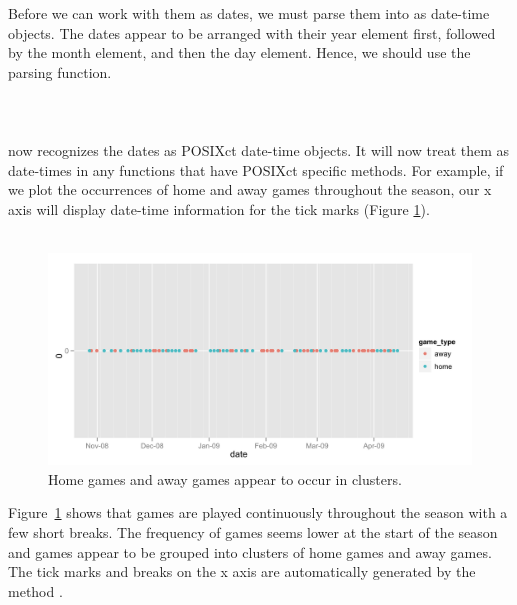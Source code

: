 \documentclass[article]{jss}
\begin{document}
Before we can work with them as dates, we must parse them into  as date-time objects. The dates appear to be arranged with their year element first, followed by the month element, and then the day element. Hence, we should use the  parsing function.\\

\\
\\
\\

 now recognizes the dates as POSIXct date-time objects. It will now treat them as date-times in any functions that have POSIXct specific methods. For example, if we plot the occurrences of home and away games throughout the season, our x axis will display date-time information for the tick marks (Figure \ref{fig:games-date}).\\

\\

\begin{figure}[htpb]
  \centering
  \includegraphics[width=\textwidth]{dates-points.png}        
  \caption{Home games and away games appear to occur in clusters.}
  \label{fig:games-date}
\end{figure}

Figure~\ref{fig:games-date} shows that games are played continuously throughout the season with a few short breaks. The frequency of games seems lower at the start of the season and games appear to be grouped into clusters of home games and away games. The tick marks and breaks on the x axis are automatically generated by the  method .\\
\end{document}
